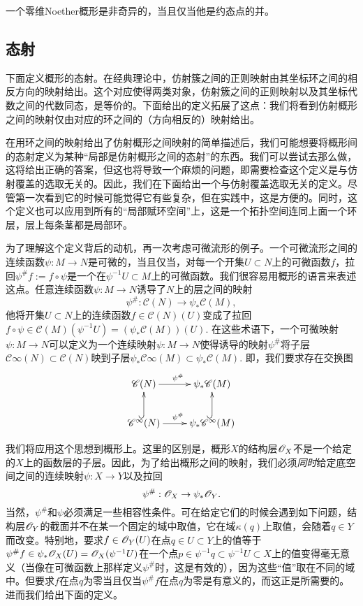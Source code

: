 \begin{exe}
一个零维Noether概形是非奇异的，当且仅当他是约态点的并。
\end{exe}

\subsection{态射} \label{s:1.2.3}

下面定义概形的态射。在经典理论中，仿射簇之间的正则映射由其坐标环之间的相反方向的映射给出。这个对应使得两类对象，仿射簇之间的正则映射以及其坐标代数之间的代数同态，是等价的。下面给出的定义拓展了这点：我们将看到仿射概形之间的映射仅由对应的环之间的（方向相反的）映射给出。

在用环之间的映射给出了仿射概形之间映射的简单描述后，我们可能想要将概形间的态射定义为某种“局部是仿射概形之间的态射”的东西。我们可以尝试去那么做，这将给出正确的答案，但这也将导致一个麻烦的问题，即需要检查这个定义是与仿射覆盖的选取无关的。因此，我们在下面给出一个与仿射覆盖选取无关的定义。尽管第一次看到它的时候可能觉得它有些复杂，但在实践中，这是方便的。同时，这个定义也可以应用到所有的“局部赋环空间”上，这是一个拓扑空间连同上面一个环层，层上每条茎都是局部环。

为了理解这个定义背后的动机，再一次考虑可微流形的例子。一个可微流形之间的连续函数$\psi:M\to N$是可微的，当且仅当，对每一个开集$U\subset N$上的可微函数$f$，拉回$\psi^\# f:=f\circ \psi$是一个在$\psi^{-1}U\subset M$上的可微函数。我们很容易用概形的语言来表述这点。任意连续函数$\psi:M\to N$诱导了$N$上的层之间的映射
\[
	\psi^\#:\mathscr C(N)\to \psi_*\mathscr C(M),
\]
他将开集$U\subset N$上的连续函数$f\in \mathscr C(N)(U)$变成了拉回$f\circ \psi\in \mathscr C(M)(\psi^{-1}U)=(\psi_*\mathscr C(M))(U)$. 在这些术语下，一个可微映射$\psi:M\to N$可以定义为一个连续映射$\psi:M\to N$使得诱导的映射$\psi^\#$将子层$\mathscr C\infty(N)\subset \mathscr C(N)$映到子层$\psi_*\mathscr C\infty(M)\subset \psi_*\mathscr C(M)$. 即，我们要求存在交换图
\[
	\xymatrix{
	\mathscr C(N)\ar[r]^{\psi^\#}&\psi_*\mathscr C(M)\\
	\mathscr C^\infty(N)\ar[r]^{\psi^\#}\ar@{^{(}->}[u]&\psi_*\mathscr C^\infty(M)\ar@{^{(}->}[u]
	}
\]

我们将应用这个思想到概形上。这里的区别是，概形$X$的结构层$\mathscr{O}_X$不是一个给定的$X$上的函数层的子层。因此，为了给出概形之间的映射，我们必须\textit{同时}给定底空间之间的连续映射$\psi:X\to Y$以及拉回
\[
	\psi^\#:\mathscr{O}_X\to\psi_*\mathscr{O}_Y.
\]
当然，$\psi^\#$和$\psi$必须满足一些相容性条件。可在给定它们的时候会遇到如下问题，结构层$\mathscr{O}_Y$的截面并不在某一个固定的域中取值，它在域$\kappa(q)$上取值，会随着$q\in Y$而改变。特别地，要求$f\in\mathscr{O}_Y(U)$在点$q\in U\subset Y$上的值等于$\psi^\# f\in \psi_*\mathscr{O}_X(U)=\mathscr{O}_X(\psi^{-1}U)$在一个点$p\in \psi^{-1}q\subset \psi^{-1}U\subset X$上的值变得毫无意义（当像在可微函数上那样定义$\psi^\#$时，这是有效的），因为这些“值”取在不同的域中。但要求$f$在点$q$为零当且仅当$\psi^\# f$在点$q$为零是有意义的，而这正是所需要的。进而我们给出下面的定义。

